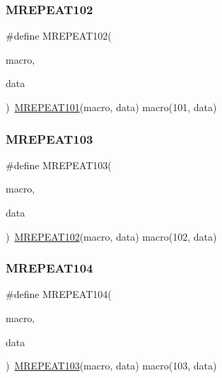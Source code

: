 \mbox{\label{group__group__sam0__utils__mrepeat_ga2418759d7f3f1ae57feab4b703f99662}} 
\subsubsection{\texorpdfstring{MREPEAT102}{MREPEAT102}}
{\footnotesize\ttfamily \#define M\+R\+E\+P\+E\+A\+T102(\begin{DoxyParamCaption}\item[{}]{macro,  }\item[{}]{data }\end{DoxyParamCaption})~\mbox{\hyperlink{group__group__sam0__utils__mrepeat_gae02508a50d4516010d562970b2466731}{M\+R\+E\+P\+E\+A\+T101}}(macro, data)   macro(101, data)}

\mbox{\label{group__group__sam0__utils__mrepeat_ga5497848f0c9b8f33dbbad94bb98a8a8b}} 
\subsubsection{\texorpdfstring{MREPEAT103}{MREPEAT103}}
{\footnotesize\ttfamily \#define M\+R\+E\+P\+E\+A\+T103(\begin{DoxyParamCaption}\item[{}]{macro,  }\item[{}]{data }\end{DoxyParamCaption})~\mbox{\hyperlink{group__group__sam0__utils__mrepeat_ga2418759d7f3f1ae57feab4b703f99662}{M\+R\+E\+P\+E\+A\+T102}}(macro, data)   macro(102, data)}

\mbox{\label{group__group__sam0__utils__mrepeat_ga22151fc326d5feb28b754cbc581902e1}} 
\subsubsection{\texorpdfstring{MREPEAT104}{MREPEAT104}}
{\footnotesize\ttfamily \#define M\+R\+E\+P\+E\+A\+T104(\begin{DoxyParamCaption}\item[{}]{macro,  }\item[{}]{data }\end{DoxyParamCaption})~\mbox{\hyperlink{group__group__sam0__utils__mrepeat_ga5497848f0c9b8f33dbbad94bb98a8a8b}{M\+R\+E\+P\+E\+A\+T103}}(macro, data)   macro(103, data)}

